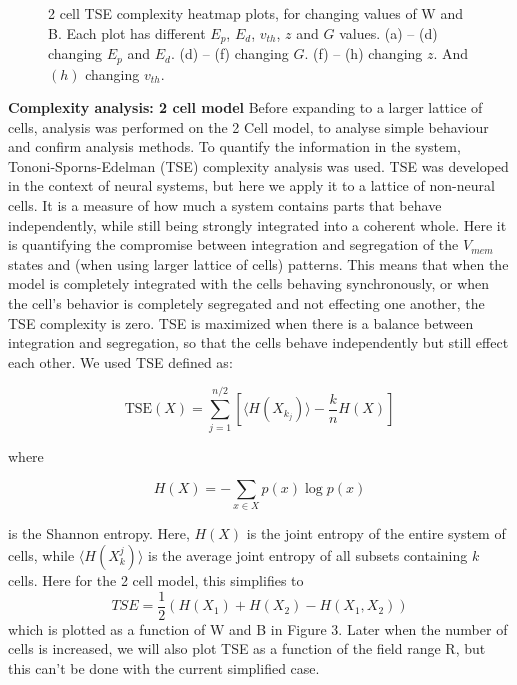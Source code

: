 \documentclass{article}
\begin{document}
\begin{flushleft}
\begin{figure}[p]
    \vspace{0.2cm}
    
    \caption{2 cell TSE complexity heatmap plots, for changing values of W and B. Each plot has different $E_p$, $E_d$, $v_{th}$, $z$ and $G$ values. (a) -- (d) changing $E_p$ and $E_d$. (d) -- (f) changing $G$. (f) -- (h) changing $z$. And $(h)$ changing $v_{th}.$}
    \label{fig:all_heatmaps_grid}
\end{figure}


\end{flushleft}

\hfill\break

\begin{flushleft}
    
\textbf{Complexity analysis: 2 cell model}
\hfill\break
\hfill\break
Before expanding to a larger lattice of cells, analysis was performed on the 2 Cell model, to analyse simple behaviour and confirm analysis methods. To quantify the information in the system, Tononi-Sporns-Edelman (TSE) complexity analysis was used. TSE was developed in the context of neural systems, but here we apply it to a lattice of non-neural cells. It is a measure of how much a system contains parts that behave independently, while still being strongly integrated into a coherent whole. Here it is quantifying the compromise between integration and segregation of the $V_{mem}$ states and (when using larger lattice of cells) patterns. This means that when the model is completely integrated with the cells behaving synchronously, or when the cell's behavior is completely segregated and not effecting one another, the TSE complexity is zero. TSE is maximized when there is a balance between integration and segregation, so that the cells behave independently but still effect each other. We used TSE defined as:

$$\text{TSE}(X) = \sum_{j=1}^{n/2} \left[ \langle H(X_{k_j}) \rangle - \frac{k}{n} H(X) \right]$$

where 

$$H(X) = -\sum_{x \in X} p(x) \log p(x)$$

is the Shannon entropy. Here, \(H(X)\) is the joint entropy of the entire system of cells, while \(\langle H(X_k^j)\rangle\) is the average joint entropy of all subsets containing \(k\) cells. Here for the 2 cell model, this simplifies to 
$$TSE = \frac{1}{2}(H(X_1) + H(X_2) - H(X_1, X_2))$$
which is plotted as a function of W and B in Figure 3. Later when the number of cells is increased, we will also plot TSE as a function of the field range R, but this can't be done with the current simplified case.


\end{flushleft}
\end{document}
